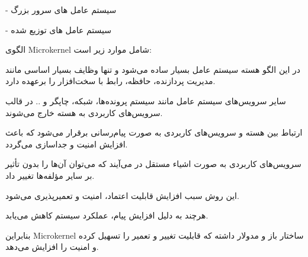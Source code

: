 - سیستم عامل های سرور بزرگ

- سیستم عامل های توزیع شده



الگوی Microkernel شامل موارد زیر است:

در این الگو هسته سیستم عامل بسیار ساده می‌شود و تنها وظایف بسیار اساسی مانند مدیریت پردازنده، حافظه، رابط با سخت‌افزار را برعهده دارد.

سایر سرویس‌های سیستم عامل مانند سیستم پرونده‌ها، شبکه، چاپگر و .. در قالب سرویس‌های کاربردی به هسته خارج می‌شوند.

ارتباط بین هسته و سرویس‌های کاربردی به صورت پیام‌رسانی 
برقرار می‌شود که باعث افزایش امنیت و جداسازی می‌گردد.

سرویس‌های کاربردی به صورت اشیاء مستقل در می‌آیند که می‌توان آن‌ها را بدون تأثیر بر سایر مؤلفه‌ها تغییر داد.

این روش سبب افزایش قابلیت اعتماد، امنیت و تعمیرپذیری می‌شود.

هرچند به دلیل افزایش پیام، عملکرد سیستم کاهش می‌یابد.

بنابراین Microkernel ساختار باز و مدولار داشته که قابلیت تغییر و تعمیر را تسهیل کرده و امنیت را افزایش می‌دهد.